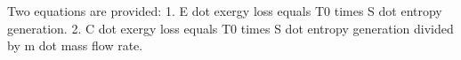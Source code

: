 Two equations are provided:  
1. E dot exergy loss equals T0 times S dot entropy generation.  
2. C dot exergy loss equals T0 times S dot entropy generation divided by m dot mass flow rate.